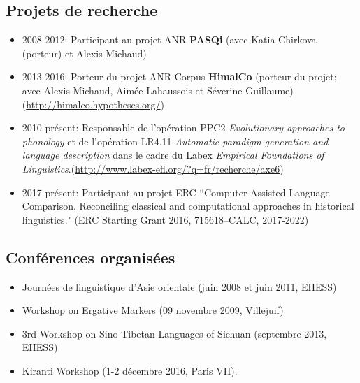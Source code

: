 \documentclass[oldfontcommands,oneside,a4paper,11pt]{article}
\begin{document}
\subsection*{Projets de recherche}
\begin{itemize}
\item 2008-2012: Participant au projet ANR \textbf{PASQi} (avec Katia Chirkova (porteur) et Alexis Michaud) 
\item  2013-2016: Porteur du projet ANR Corpus \textbf{HimalCo} (porteur du projet; avec Alexis Michaud, Aimée Lahaussois et Séverine Guillaume) (\url{http://himalco.hypotheses.org/})
\item 2010-présent: Responsable de l'opération PPC2-\textit{Evolutionary approaches to phonology} et de l'opération LR4.11-\textit{Automatic paradigm generation and language description} dans le cadre du Labex \textit{Empirical Foundations of Linguistics}.(\url{http://www.labex-efl.org/?q=fr/recherche/axe6})
\item 2017-présent: Participant au projet ERC ``Computer-Assisted Language Comparison. Reconciling classical
and computational approaches in historical linguistics." (ERC Starting Grant 2016, 715618–CALC, 2017-2022)
\end{itemize}
\subsection*{Conférences organisées} 
\begin{itemize}
\item Journées de linguistique d'Asie orientale (juin 2008 et juin 2011, EHESS)
\item Workshop on Ergative Markers (09 novembre 2009, Villejuif)
\item 3rd Workshop on Sino-Tibetan Languages of Sichuan (septembre 2013, EHESS)
\item Kiranti Workshop (1-2 décembre 2016, Paris VII).
\end{itemize}
\end{document}
